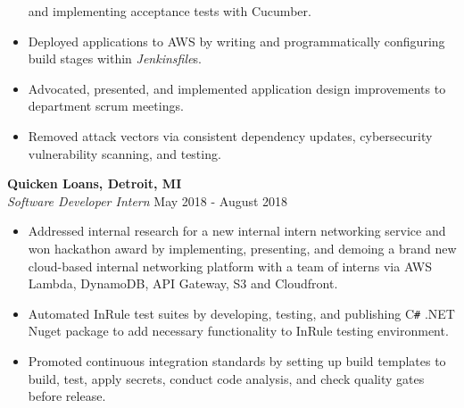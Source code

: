 \documentclass[overlapped]{res}
\begin{document}
\begin{resume}
\begin{itemize}
    and implementing acceptance tests with Cucumber.
    \item Deployed applications to AWS by
    writing and programmatically configuring build stages within {\it Jenkinsfile}s.
    \item Advocated, presented, and implemented application design improvements to department scrum meetings.
    \item Removed attack vectors via consistent dependency updates, cybersecurity vulnerability scanning, and testing.
\end{itemize}

\textbf{Quicken Loans, Detroit, MI} \\
{\sl Software Developer Intern}  \hfill May 2018 - August 2018
\begin{itemize}  \itemsep -2pt %

    \item Addressed internal research for a new internal intern networking service
    and won hackathon award
    by implementing, presenting, and demoing 
    a brand new cloud-based internal
    networking platform with a team of interns via
    AWS Lambda, DynamoDB, API Gateway, S3 and Cloudfront.

    \item Automated InRule test suites by developing, testing, and publishing 
    C\texttt{\#} .NET Nuget package to add
    necessary functionality to InRule testing environment.

    \item Promoted continuous integration standards by setting up build templates to build,
    test, apply secrets, conduct code analysis,
    and check quality gates before release.




\end{itemize}
\end{resume}
\end{document}
